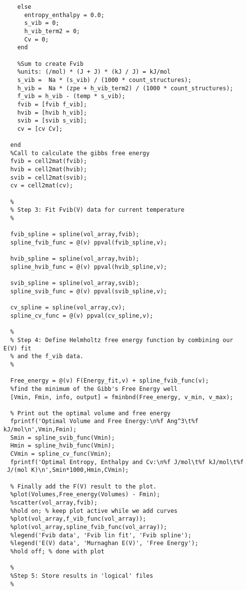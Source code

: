 \documentclass[11pt,letterpaper]{article}
\begin{document}
\begin{spacing}{1.0}
\begin{verbatim}
    else
      entropy_enthalpy = 0.0;
      s_vib = 0;
      h_vib_term2 = 0;
      Cv = 0;
    end
    
    %Sum to create Fvib
    %units: (/mol) * (J + J) * (kJ / J) = kJ/mol
    s_vib =  Na * (s_vib) / (1000 * count_structures);
    h_vib =  Na * (zpe + h_vib_term2) / (1000 * count_structures);
    f_vib = h_vib - (temp * s_vib);
    fvib = [fvib f_vib];
    hvib = [hvib h_vib];   
    svib = [svib s_vib];
    cv = [cv Cv];

  end
  %Call to calculate the gibbs free energy
  fvib = cell2mat(fvib);
  hvib = cell2mat(hvib);
  svib = cell2mat(svib);
  cv = cell2mat(cv);
  
  %
  % Step 3: Fit Fvib(V) data for current temperature
  %
  
  fvib_spline = spline(vol_array,fvib);
  spline_fvib_func = @(v) ppval(fvib_spline,v);
  
  hvib_spline = spline(vol_array,hvib);
  spline_hvib_func = @(v) ppval(hvib_spline,v);  
  
  svib_spline = spline(vol_array,svib);
  spline_svib_func = @(v) ppval(svib_spline,v); 
  
  cv_spline = spline(vol_array,cv);
  spline_cv_func = @(v) ppval(cv_spline,v); 
  
  %
  % Step 4: Define Helmholtz free energy function by combining our E(V) fit
  % and the f_vib data.
  %

  Free_energy = @(v) F(Energy_fit,v) + spline_fvib_func(v); 
  %find the minimum of the Gibb's Free Energy well
  [Vmin, Fmin, info, output] = fminbnd(Free_energy, v_min, v_max);
  
  % Print out the optimal volume and free energy
  fprintf('Optimal Volume and Free Energy:\n%f Ang^3\t%f kJ/mol\n',Vmin,Fmin);
  Smin = spline_svib_func(Vmin);
  Hmin = spline_hvib_func(Vmin);
  CVmin = spline_cv_func(Vmin);
  fprintf('Optimal Entropy, Enthalpy and Cv:\n%f J/mol\t%f kJ/mol\t%f
 J/(mol K)\n',Smin*1000,Hmin,CVmin);
  
  % Finally add the F(V) result to the plot.
  %plot(Volumes,Free_energy(Volumes) - Fmin);
  %scatter(vol_array,fvib); 
  %hold on; % keep plot active while we add curves
  %plot(vol_array,f_vib_func(vol_array));
  %plot(vol_array,spline_fvib_func(vol_array));
  %legend('Fvib data', 'Fvib lin fit', 'Fvib spline');
  %legend('E(V) data', 'Murnaghan E(V)', 'Free Energy');
  %hold off; % done with plot
  
  %
  %Step 5: Store results in 'logical' files
  %
  

\end{verbatim}
\end{spacing}
\end{document}
